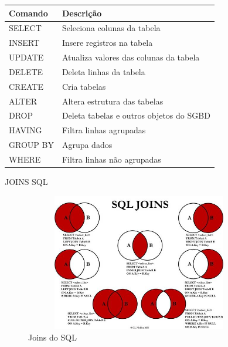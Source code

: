\begin{frame}
	\begin{table}[]
		\begin{tabular}{|l|l|}
		\hline
			\textbf{Comando} & \textbf{Descrição}                      \\ \hline
			SELECT           & Seleciona colunas da tabela             \\ \hline
			INSERT           & Insere registros na tabela              \\ \hline
			UPDATE           & Atualiza valores das colunas da tabela  \\ \hline
			DELETE           & Deleta linhas da tabela                 \\ \hline
			CREATE           & Cria tabelas                            \\ \hline
			ALTER            & Altera estrutura das tabelas            \\ \hline
			DROP             & Deleta tabelas e outros objetos do SGBD \\ \hline
			HAVING           & Filtra linhas agrupadas                 \\ \hline
			GROUP BY         & Agrupa dados                            \\ \hline
			WHERE            & Filtra linhas não agrupadas             \\ \hline
		\end{tabular}
	\end{table}
\end{frame}

\begin{frame}
	\begin{block}{JOINS SQL}
		\begin{figure}[!htb]
			\centering	  				
			\includegraphics[height=6cm, width = 10cm]{./pic/sqlJoins.jpg}
			\caption{Joins do SQL \cite{SQLiteTutorial}}
			\label{fig_Joins_sql}
		\end{figure}
	\end{block}
\end{frame}

